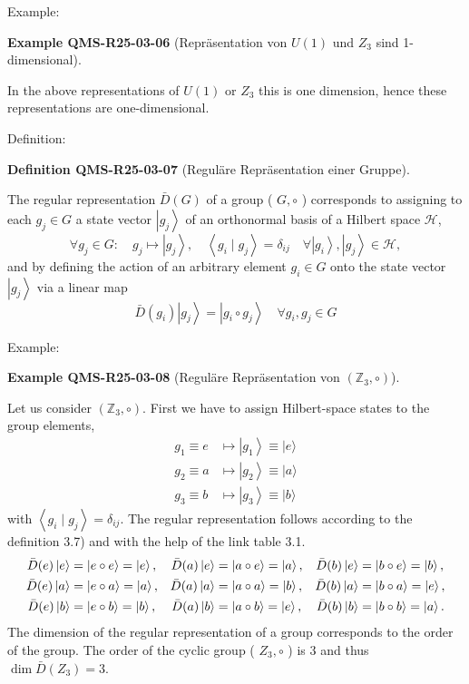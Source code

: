 \documentclass[10pt, letterpaper]{article}
\newcommand{\CustomHeading}[3]{%
  \par\medskip\noindent%
  \textbf{#1 #2} \textnormal{(#3)}.\enskip%
}
\newenvironment{DEF}[2]{\begin{unitbox}\CustomHeading{Definition}{#1}{#2}}{\end{unitbox}}
\newenvironment{EXA}[2]{\begin{unitbox}\CustomHeading{Example}{#1}{#2}}{\end{unitbox}}
\begin{document}
Example: 

\begin{EXA}{QMS-R25-03-06}{Repräsentation von $U(1)$ und $Z_3$ sind 1-dimensional}
In the above representations of $U(1)$ or $Z_{3}$ this is one dimension, hence these representations are one-dimensional.
\end{EXA}


Definition: 

\begin{DEF}{QMS-R25-03-07}{Reguläre Repräsentation einer Gruppe}
The regular representation $\bar{D}(G)$ of a group ( $G, \circ$ ) corresponds to assigning to each $g_{j} \in G$ a state vector $\left|g_{j}\right\rangle$ of an orthonormal basis of a Hilbert space $\mathcal{H}$,
$$
\forall g_{j} \in G: \quad g_{j} \mapsto\left|g_{j}\right\rangle, \quad\left\langle g_{i} \mid g_{j}\right\rangle=\delta_{i j} \quad \forall\left|g_{i}\right\rangle,\left|g_{j}\right\rangle \in \mathcal{H},
$$
and by defining the action of an arbitrary element $g_{i} \in G$ onto the state vector $\left|g_{j}\right\rangle$ via a linear map
$$
\bar{D}\left(g_{i}\right)\left|g_{j}\right\rangle=\left|g_{i} \circ g_{j}\right\rangle \quad \forall g_{i}, g_{j} \in G
$$
\end{DEF}


Example: 

\begin{EXA}{QMS-R25-03-08}{Reguläre Repräsentation von $(\mathbb{Z}_3,\circ)$}
Let us consider $(\mathbb{Z}_3,\circ)$. First we have to assign Hilbert-space states to the group elements,
$$
\begin{aligned} g_1 \equiv e & \mapsto\left|g_1\right\rangle \equiv|e\rangle \\ g_2 \equiv a & \mapsto\left|g_2\right\rangle \equiv|a\rangle \\ g_3 \equiv b & \mapsto\left|g_3\right\rangle \equiv|b\rangle\end{aligned}
$$
with $\left\langle g_{i} \mid g_{j}\right\rangle=\delta_{i j}$. The regular representation follows according to the definition 3.7) and with the help of the link table 3.1.
\[
\begin{aligned}
\bar{D}(e)\ket{e} &= \ket{e \circ e} = \ket{e}, & \bar{D}(a)\ket{e} &= \ket{a \circ e} = \ket{a}, & \bar{D}(b)\ket{e} &= \ket{b \circ e} = \ket{b}, \\ 
\bar{D}(e)\ket{a} &= \ket{e \circ a} = \ket{a}, & \bar{D}(a)\ket{a} &= \ket{a \circ a} = \ket{b}, & \bar{D}(b)\ket{a} &= \ket{b \circ a} = \ket{e}, \\
\bar{D}(e)\ket{b} &= \ket{e \circ b} = \ket{b}, & \bar{D}(a)\ket{b} &= \ket{a \circ b} = \ket{e}, & \bar{D}(b)\ket{b} &= \ket{b \circ b} = \ket{a}. 
\end{aligned}
\]
The dimension of the regular representation of a group corresponds to the order of the group. The order of the cyclic group ( $Z_{3}, \circ$ ) is 3 and thus $\operatorname{dim} \bar{D}\left(Z_{3}\right)=3$.
\end{EXA}
\end{document}
